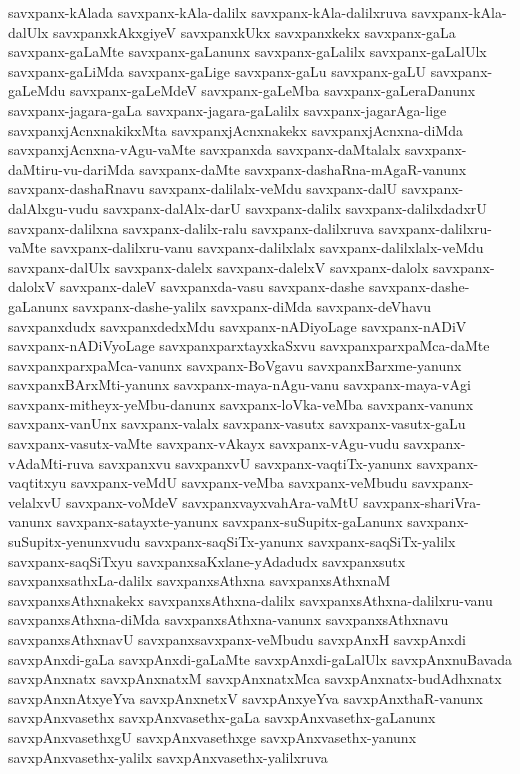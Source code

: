 {savxpanx-kAlada
savxpanx-kAla-dalilx
savxpanx-kAla-dalilxruva
savxpanx-kAla-dalUlx
savxpanxkAkxgiyeV
savxpanxkUkx
savxpanxkekx
savxpanx-gaLa
savxpanx-gaLaMte
savxpanx-gaLanunx
savxpanx-gaLalilx
savxpanx-gaLalUlx
savxpanx-gaLiMda
savxpanx-gaLige
savxpanx-gaLu
savxpanx-gaLU
savxpanx-gaLeMdu
savxpanx-gaLeMdeV
savxpanx-gaLeMba
savxpanx-gaLeraDanunx
savxpanx-jagara-gaLa
savxpanx-jagara-gaLalilx
savxpanx-jagarAga-lige
savxpanxjAcnxnakikxMta
savxpanxjAcnxnakekx
savxpanxjAcnxna-diMda
savxpanxjAcnxna-vAgu-vaMte
savxpanxda
savxpanx-daMtalalx
savxpanx-daMtiru-vu-dariMda
savxpanx-daMte
savxpanx-dashaRna-mAgaR-vanunx
savxpanx-dashaRnavu
savxpanx-dalilalx-veMdu
savxpanx-dalU
savxpanx-dalAlxgu-vudu
savxpanx-dalAlx-darU
savxpanx-dalilx
savxpanx-dalilxdadxrU
savxpanx-dalilxna
savxpanx-dalilx-ralu
savxpanx-dalilxruva
savxpanx-dalilxru-vaMte
savxpanx-dalilxru-vanu
savxpanx-dalilxlalx
savxpanx-dalilxlalx-veMdu
savxpanx-dalUlx
savxpanx-dalelx
savxpanx-dalelxV
savxpanx-dalolx
savxpanx-dalolxV
savxpanx-daleV
savxpanxda-vasu
savxpanx-dashe
savxpanx-dashe-gaLanunx
savxpanx-dashe-yalilx
savxpanx-diMda
savxpanx-deVhavu
savxpanxdudx
savxpanxdedxMdu
savxpanx-nADiyoLage
savxpanx-nADiV
savxpanx-nADiVyoLage
savxpanxparxtayxkaSxvu
savxpanxparxpaMca-daMte
savxpanxparxpaMca-vanunx
savxpanx-BoVgavu
savxpanxBarxme-yanunx
savxpanxBArxMti-yanunx
savxpanx-maya-nAgu-vanu
savxpanx-maya-vAgi
savxpanx-mitheyx-yeMbu-danunx
savxpanx-loVka-veMba
savxpanx-vanunx
savxpanx-vanUnx
savxpanx-valalx
savxpanx-vasutx
savxpanx-vasutx-gaLu
savxpanx-vasutx-vaMte
savxpanx-vAkayx
savxpanx-vAgu-vudu
savxpanx-vAdaMti-ruva
savxpanxvu
savxpanxvU
savxpanx-vaqtiTx-yanunx
savxpanx-vaqtitxyu
savxpanx-veMdU
savxpanx-veMba
savxpanx-veMbudu
savxpanx-velalxvU
savxpanx-voMdeV
savxpanxvayxvahAra-vaMtU
savxpanx-shariVra-vanunx
savxpanx-satayxte-yanunx
savxpanx-suSupitx-gaLanunx
savxpanx-suSupitx-yenunxvudu
savxpanx-saqSiTx-yanunx
savxpanx-saqSiTx-yalilx
savxpanx-saqSiTxyu
savxpanxsaKxlane-yAdadudx
savxpanxsutx
savxpanxsathxLa-dalilx
savxpanxsAthxna
savxpanxsAthxnaM
savxpanxsAthxnakekx
savxpanxsAthxna-dalilx
savxpanxsAthxna-dalilxru-vanu
savxpanxsAthxna-diMda
savxpanxsAthxna-vanunx
savxpanxsAthxnavu
savxpanxsAthxnavU
savxpanxsavxpanx-veMbudu
savxpAnxH
savxpAnxdi
savxpAnxdi-gaLa
savxpAnxdi-gaLaMte
savxpAnxdi-gaLalUlx
savxpAnxnuBavada
savxpAnxnatx
savxpAnxnatxM
savxpAnxnatxMca
savxpAnxnatx-budAdhxnatx
savxpAnxnAtxyeYva
savxpAnxnetxV
savxpAnxyeYva
savxpAnxthaR-vanunx
savxpAnxvasethx
savxpAnxvasethx-gaLa
savxpAnxvasethx-gaLanunx
savxpAnxvasethxgU
savxpAnxvasethxge
savxpAnxvasethx-yanunx
savxpAnxvasethx-yalilx
savxpAnxvasethx-yalilxruva
}
